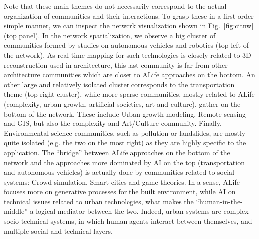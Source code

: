 \documentclass[10pt]{article}
\begin{document}
Note that these main themes do not necessarily correspond to the actual organization of communities and their interactions. To grasp these in a first order simple manner, we can inspect the network visualization shown in Fig.~\ref{fig:citnw} (top panel). In the network spatialization, we observe a big cluster of communities formed by studies on autonomous vehicles and robotics (top left of the network). As real-time mapping for such technologies is closely related to 3D reconstruction used in architecture, this last community is far from other architecture communities which are closer to ALife approaches on the bottom. An other large and relatively isolated cluster corresponds to the transportation theme (top right cluster), while more sparse communities, mostly related to ALife (complexity, urban growth, artificial societies, art and culture), gather on the bottom of the network. These include Urban growth modeling, Remote sensing and GIS, but also the complexity and Art/Culture community. Finally, Environmental science communities, such as pollution or landslides, are mostly quite isolated (e.g. the two on the most right) as they are highly specific to the application. The ``bridge'' between ALife approaches on the bottom of the network and the approaches more dominated by AI on the top (transportation and autonomous vehicles) is actually done by communities related to social systems: Crowd simulation, Smart cities and game theories. In a sense, ALife focuses more on generative processes for the built environment, while AI on technical issues related to urban technologies, what makes the ``human-in-the-middle'' a logical mediator between the two. Indeed, urban systems are complex socio-technical systems, in which human agents interact between themselves, and multiple social and technical layers.
\end{document}
